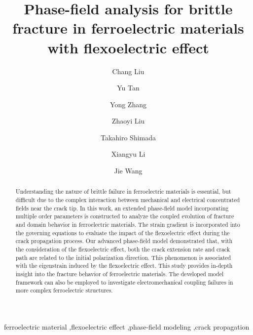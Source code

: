 \documentclass[times,fleqn,11pt]{elsarticle}
\begin{document}
\begin{frontmatter}

\title{Phase-field analysis for brittle fracture in ferroelectric materials with flexoelectric effect}

\author[inst1]{Chang Liu}
\author[inst2]{Yu Tan}
\author[inst3]{Yong Zhang}
\author[inst1]{Zhaoyi Liu}
\author[inst4]{Takahiro Shimada}
\author[inst1]{Xiangyu Li}
\author[inst5]{Jie Wang}



\begin{abstract}
Understanding the nature of brittle failure in ferroelectric materials is essential, but difficult due to the complex interaction between mechanical and electrical concentrated fields near the crack tip. In this work, an extended phase-field model incorporating multiple order parameters is constructed to analyze the coupled evolution of fracture and domain behavior in ferroelectric materials. The strain gradient is incorporated into the governing equations to evaluate the impact of the flexoelectric effect during the crack propagation process. Our advanced phase-field model demonstrated that, with the consideration of the flexoelectric effect, both the crack extension rate and crack path are related to the initial polarization direction. This phenomenon is  associated with the eigenstrain induced by the flexoelectric effect. This study provides in-depth insight into the fracture behavior of ferroelectric materials. The developed model framework can also be employed to investigate electromechanical coupling failures in more complex ferroelectric structures.
\end{abstract}

\begin{keyword}
ferroelectric material \sep flexoelectric effect \sep phase-field modeling \sep crack propagation 

\end{keyword}

\end{frontmatter}
\end{document}
